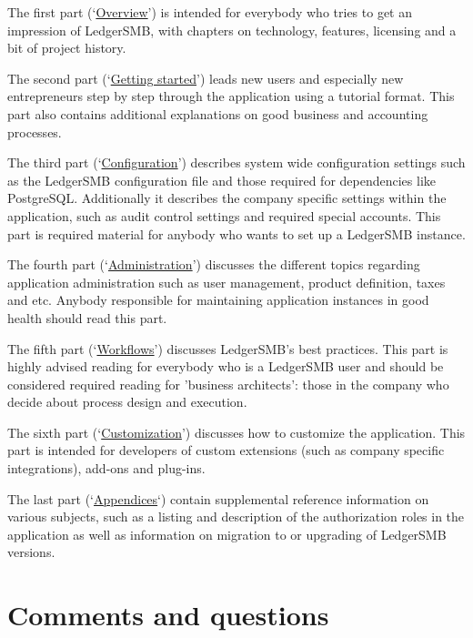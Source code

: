 \documentclass[10pt,a4paper]{book}
\begin{document}
The first
part (\lq\hyperref[part-overview]{Overview}\rq) is intended for everybody who tries to get an impression of LedgerSMB, with
chapters on technology, features, licensing and a bit of project history.

The second part
(\lq\hyperref[part-getting-started]{Getting started}\rq) leads new users and especially new entrepreneurs step by step through the
application using a tutorial format. This part also contains additional explanations on good business and accounting
processes.

The third part (\lq\hyperref[part-configuration]{Configuration}\rq) describes system wide configuration settings such as
the LedgerSMB configuration file and those required for dependencies like PostgreSQL. Additionally
it describes the company specific settings within the application, such as audit control settings
and required special accounts. This part is required material for anybody who wants to set up
a LedgerSMB instance.

The fourth part (\lq\hyperref[part-administration]{Administration}\rq) discusses the different topics
regarding application administration such as user management, product definition, taxes and etc.
Anybody responsible for maintaining application instances in good health should read this part.

The fifth part (\lq\hyperref[part-workflows]{Workflows}\rq) discusses LedgerSMB's best practices. 
This part is highly advised
reading for everybody who is a LedgerSMB user and should be considered required reading for 'business
architects': those in the company who decide about process design and execution.

The sixth part (\lq\hyperref[part-customization]{Customization}\rq) discusses how to customize the application. 
This part is intended for developers of
custom extensions (such as company specific integrations), add-ons and plug-ins.

The last part (\lq\hyperref[part-appendices]{Appendices}\lq) contain supplemental reference information on various subjects, 
such as a listing and description
of the authorization roles in the application as well as information on migration to or upgrading of
LedgerSMB versions.


\section*{Comments and questions}
\label{sec-comments}
\end{document}
